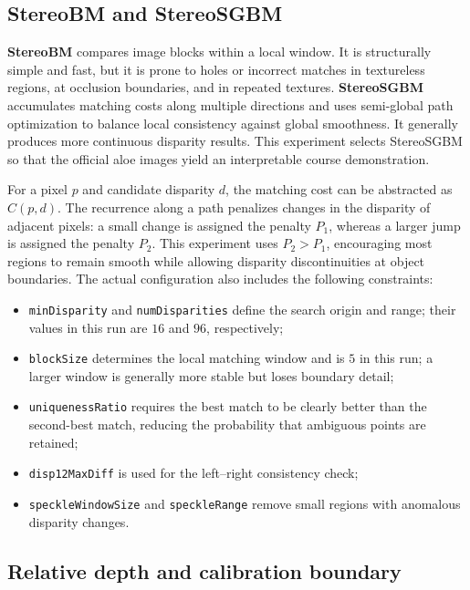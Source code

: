 \subsection{StereoBM and StereoSGBM}

\textbf{StereoBM} compares image blocks within a local window. It is structurally simple and fast, but it is prone to holes or incorrect matches in textureless regions, at occlusion boundaries, and in repeated textures. \textbf{StereoSGBM} accumulates matching costs along multiple directions and uses semi-global path optimization to balance local consistency against global smoothness. It generally produces more continuous disparity results. This experiment selects StereoSGBM so that the official aloe images yield an interpretable course demonstration.

For a pixel $p$ and candidate disparity $d$, the matching cost can be abstracted as $C(p,d)$. The recurrence along a path penalizes changes in the disparity of adjacent pixels: a small change is assigned the penalty $P_1$, whereas a larger jump is assigned the penalty $P_2$. This experiment uses $P_2>P_1$, encouraging most regions to remain smooth while allowing disparity discontinuities at object boundaries. The actual configuration also includes the following constraints:

\begin{itemize}
  \item \texttt{minDisparity} and \texttt{numDisparities} define the search origin and range; their values in this run are $16$ and $96$, respectively;
  \item \texttt{blockSize} determines the local matching window and is $5$ in this run; a larger window is generally more stable but loses boundary detail;
  \item \texttt{uniquenessRatio} requires the best match to be clearly better than the second-best match, reducing the probability that ambiguous points are retained;
  \item \texttt{disp12MaxDiff} is used for the left--right consistency check;
  \item \texttt{speckleWindowSize} and \texttt{speckleRange} remove small regions with anomalous disparity changes.
\end{itemize}

\subsection{Relative depth and calibration boundary}

